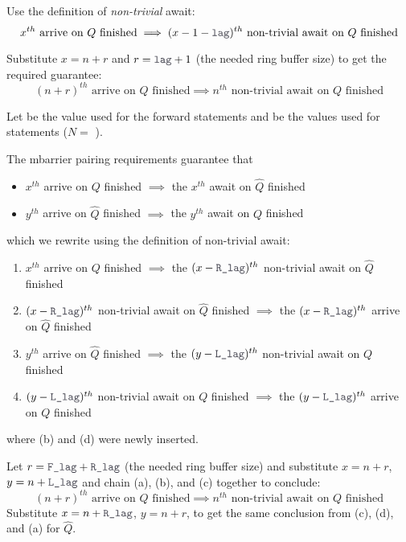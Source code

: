 \filbreak
Use the definition of \textit{non-trivial} await:
\begin{equation*}
  x^{th} \text{ arrive on $Q$ finished} \implies (x-1-\lighttt{lag})^{th} \text{ non-trivial await on $Q$ finished}
\end{equation*}

\filbreak
Substitute $x=n+r$ and $r=\lighttt{lag}+1$ (the needed ring buffer size) to get the required guarantee:
\begin{equation*}
  (n+r)^{th} \text{ arrive on $Q$ finished} \implies n^{th} \text{ non-trivial await on $Q$ finished}
\end{equation*}

\filbreak
{}
Let  be the  value used for the forward  statements and  be the  values used for  statements ($N =$ ).

\filbreak
The mbarrier pairing requirements guarantee that
\begin{itemize}
  \item $x^{th}$ arrive on $Q$ finished $\implies$ the $x^{th}$ await on $\widehat{Q}$ finished
  \filbreak
  \item $y^{th}$ arrive on $\widehat{Q}$ finished $\implies$ the $y^{th}$ await on $Q$ finished
\end{itemize}
\filbreak
which we rewrite using the definition of non-trivial await:
\begin{enumerate}
  \item $x^{th}$ arrive on $Q$ finished $\implies$ the $(x-\lighttt{R\_lag})^{th}$ non-trivial await on $\widehat{Q}$ finished
  \filbreak
  \item $(x-\lighttt{R\_lag})^{th}$ non-trivial await on $\widehat{Q}$ finished $\implies$ the $(x-\lighttt{R\_lag})^{th}$ arrive on $\widehat{Q}$ finished
  \filbreak
  \item $y^{th}$ arrive on $\widehat{Q}$ finished $\implies$ the $(y-\lighttt{L\_lag})^{th}$ non-trivial await on $Q$ finished
  \filbreak
  \item $(y-\lighttt{L\_lag})^{th}$ non-trivial await on $Q$ finished $\implies$ the $(y-\lighttt{L\_lag})^{th}$ arrive on $Q$ finished
\end{enumerate}
where (b) and (d) were newly inserted.

\filbreak
Let $r = \lighttt{F\_lag} + \lighttt{R\_lag}$ (the needed ring buffer size) and substitute $x = n + r$, $y = n + \lighttt{L\_lag}$ and chain (a), (b), and (c) together to conclude:
\begin{equation*}
  (n+r)^{th} \text{ arrive on $Q$ finished} \implies n^{th} \text{ non-trivial await on $Q$ finished}
\end{equation*}
Substitute $x = n + \lighttt{R\_lag}$, $y = n+r$, to get the same conclusion from (c), (d), and (a) for $\widehat{Q}$.

